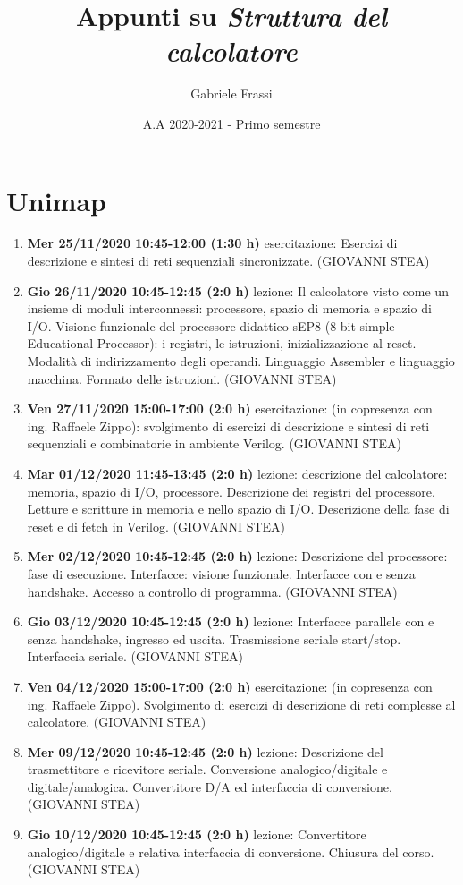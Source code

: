 \documentclass[11pt]{report}
\begin{document}
\title{Appunti su \emph{Struttura del calcolatore}}
\author{Gabriele Frassi}
\date{A.A 2020-2021 - Primo semestre}
\maketitle

\small\tableofcontents\normalsize

\chapter{Unimap}
\small
\begin{enumerate}
\item \textbf{Mer 25/11/2020 10:45-12:00 (1:30 h)} esercitazione: Esercizi di descrizione e sintesi di reti sequenziali sincronizzate. (GIOVANNI STEA)
\item \textbf{Gio 26/11/2020 10:45-12:45 (2:0 h)} lezione: Il calcolatore visto come un insieme di moduli interconnessi: processore, spazio di memoria e spazio di I/O. Visione funzionale del processore didattico sEP8 (8 bit simple Educational Processor): i registri, le istruzioni, inizializzazione al reset. Modalità di indirizzamento degli operandi. Linguaggio Assembler e linguaggio macchina. Formato delle istruzioni. (GIOVANNI STEA)
\item \textbf{Ven 27/11/2020 15:00-17:00 (2:0 h)} esercitazione: (in copresenza con ing. Raffaele Zippo): svolgimento di esercizi di descrizione e sintesi di reti sequenziali e combinatorie in ambiente Verilog. (GIOVANNI STEA)
\item \textbf{Mar 01/12/2020 11:45-13:45 (2:0 h)} lezione: descrizione del calcolatore: memoria, spazio di I/O, processore. Descrizione dei registri del processore. Letture e scritture in memoria e nello spazio di I/O. Descrizione della fase di reset e di fetch in Verilog. (GIOVANNI STEA)
\item \textbf{Mer 02/12/2020 10:45-12:45 (2:0 h)} lezione: Descrizione del processore: fase di esecuzione. Interfacce: visione funzionale. Interfacce con e senza handshake. Accesso a controllo di programma. (GIOVANNI STEA)
\item \textbf{Gio 03/12/2020 10:45-12:45 (2:0 h)} lezione: Interfacce parallele con e senza handshake, ingresso ed uscita. Trasmissione seriale start/stop. Interfaccia seriale. (GIOVANNI STEA)
\item \textbf{Ven 04/12/2020 15:00-17:00 (2:0 h)} esercitazione: (in copresenza con ing. Raffaele Zippo). Svolgimento di esercizi di descrizione di reti complesse al calcolatore. (GIOVANNI STEA)
\item \textbf{Mer 09/12/2020 10:45-12:45 (2:0 h)} lezione: Descrizione del trasmettitore e ricevitore seriale. Conversione analogico/digitale e digitale/analogica. Convertitore D/A ed interfaccia di conversione. (GIOVANNI STEA)
\item \textbf{Gio 10/12/2020 10:45-12:45 (2:0 h)} lezione: Convertitore analogico/digitale e relativa interfaccia di conversione. Chiusura del corso. (GIOVANNI STEA)
\end{enumerate}
\normalsize
\end{document}
